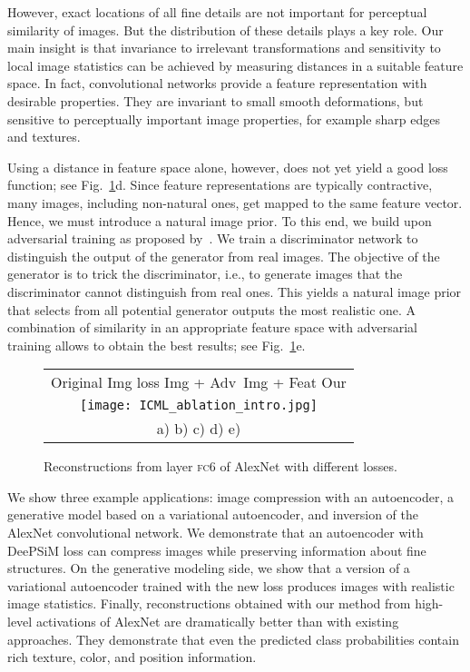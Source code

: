 \documentclass{article}
\newcommand{\fc}{\textsc{fc}}
\newcommand{\ourapproach}{DeePSiM }
\begin{document}
However, exact locations of all fine details are not important for perceptual similarity of images.
But the distribution of these details plays a key role. 
Our main insight is that invariance to irrelevant transformations and sensitivity to local image statistics can be achieved by measuring distances in a suitable feature space. 
In fact, convolutional networks provide a feature representation with desirable properties.
They are invariant to small smooth deformations, but sensitive to perceptually important image properties, for example sharp edges and textures.

Using a distance in feature space alone, however, does not yet yield a good loss function; see Fig.~\ref{fig:ablation_intro}d.
Since feature representations are typically contractive, many images, including non-natural ones, get mapped to the same feature vector.
Hence, we must introduce a natural image prior.
To this end, we build upon adversarial training as proposed by~\citet{Goodfellow_NIPS2014}.
We train a discriminator network to distinguish the output of the generator from real images.
The objective of the generator is to trick the discriminator, i.e., to generate images that the discriminator cannot distinguish from real ones. 
This yields a natural image prior that selects from all potential generator outputs the most realistic one. 
A combination of similarity in an appropriate feature space with adversarial training allows to obtain the best results; see Fig.~\ref{fig:ablation_intro}e.


\begin{figure}[b]
\begin{center}
\setlength{\tabcolsep}{0.1cm}
\renewcommand{\arraystretch}{1}
\small{
  \begin{tabular}{c}
  Original \;\;\; Img loss \; Img + Adv\,  Img + Feat \quad\; Our\;\;\;\;  \\
  \texttt{[image: ICML\_ablation\_intro.jpg]}\\
  a) \quad\qquad\;\; b) \quad\qquad\; c) \quad\qquad\; d) \qquad\quad\;\; e)
   \end{tabular}}
   \vspace{-0.15cm}
\end{center}
   \caption{Reconstructions from layer \fc6 of AlexNet with different losses.}
\label{fig:ablation_intro}
\end{figure}

We show three example applications: image compression with an autoencoder, a generative model based on a variational autoencoder, and inversion of the AlexNet convolutional network. 
We demonstrate that an autoencoder with \ourapproach loss can compress images  while preserving information about fine structures.
On the generative modeling side, we show that a version of a variational autoencoder trained with the new loss produces images with realistic image statistics. 
Finally, reconstructions obtained with our method from high-level activations of AlexNet are dramatically better than with existing approaches. They demonstrate that even the predicted class probabilities contain rich texture, color, and position information.
\end{document}
